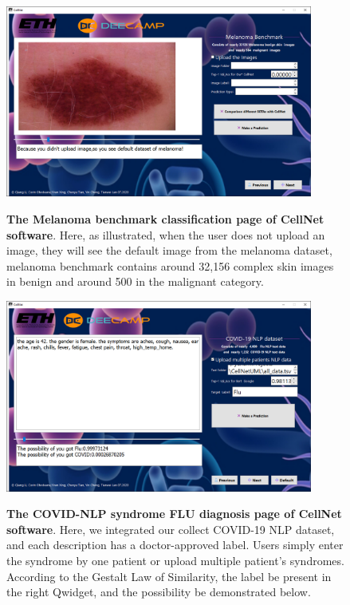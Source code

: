\begin{figure}[t]
\begin{center}
\includegraphics[height=0.3\textheight,width=0.9\textwidth]{thesis-template-master/images/cellnet6-1page.PNG}
\label{fig:cellnet}
\end{center}
\caption{ \textbf{The Melanoma benchmark classification page of CellNet software}. Here, as illustrated, when the user does not upload an image, they will see the default image from the melanoma dataset, melanoma benchmark contains around 32,156 complex skin images in benign and around 500 in the malignant category.}
\end{figure}


\begin{figure}[t]
\begin{center}
\includegraphics[height=0.3\textheight,width=0.9\textwidth]{thesis-template-master/images/cellnet7-2page.PNG}
\label{fig:cellnet}
\end{center}
\caption{ \textbf{The COVID-NLP syndrome FLU diagnosis page of CellNet software}. Here, we integrated our collect COVID-19 NLP dataset, and each description has a doctor-approved label. Users simply enter the syndrome by one patient or upload multiple patient's syndromes. According to the Gestalt Law of Similarity, the label be present in the right Qwidget, and the possibility be demonstrated below.}
\end{figure}


